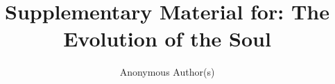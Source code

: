 \documentclass[sigconf,anonymous]{aamas}
\title{Supplementary Material for: The Evolution of the Soul}
\author{Anonymous Author(s)}
\affiliation{\institution{Anonymous Institution}\country{Country}}
\begin{document}
\maketitle


\FloatBarrier


\end{document}
